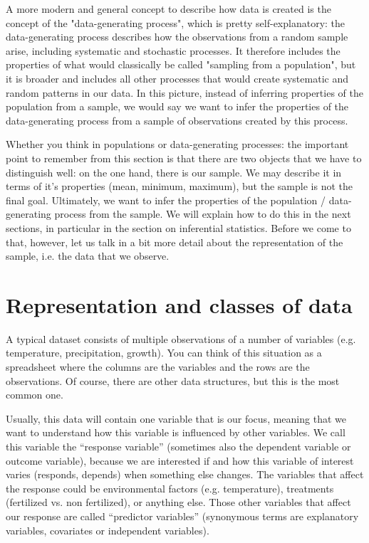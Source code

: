 \documentclass[a4paper,twoside]{tufte-book}\usepackage[]{graphicx}\usepackage[]{color}
\begin{document}
 A more modern and general concept to describe how data is created is the concept of the "data-generating process", which is pretty self-explanatory: the data-generating process describes how the observations from a random sample arise, including systematic and stochastic processes. It therefore includes the properties of what would classically be called "sampling from a population", but it is broader and includes all other processes that would create systematic and random patterns in our data. In this picture, instead of inferring properties of the population from a sample, we would say we want to infer the properties of the data-generating process from a sample of observations created by this process.

Whether you think in populations or data-generating processes: the important point to remember from this section is that there are two objects that we have to distinguish well: on the one hand, there is our sample. We may describe it in terms of it's properties (mean, minimum, maximum), but the sample is not the final goal. Ultimately, we want to infer the properties of the population / data-generating process from the sample. We will explain how to do this in the next sections, in particular in the section on inferential statistics. Before we come to that, however, let us talk in a bit more detail about the representation of the sample, i.e. the data that we observe.

\section{Representation and classes of data}

A typical dataset consists of multiple observations of a number of variables (e.g. temperature, precipitation, growth). You can think of this situation as a spreadsheet where the columns are the variables and the rows are the observations. Of course, there are other data structures, but this is the most common one.

Usually, this data will contain one variable that is our focus, meaning that we want to understand how this variable is influenced by other variables.  We call this variable the ``response variable'' (sometimes also the dependent variable or outcome variable), because we are interested if and how this variable of interest varies (responds, depends) when something else changes. The variables that affect the response could be environmental factors (e.g. temperature), treatments (fertilized vs. non fertilized), or anything else.  Those other variables that affect our response are called ``predictor variables'' (synonymous terms are explanatory variables, covariates or independent variables). 
\end{document}
